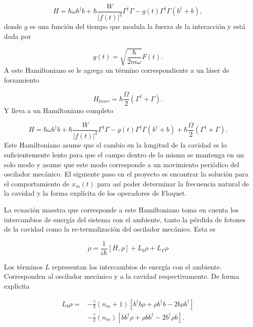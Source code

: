 \documentclass[10pt,a4paper]{report}
\begin{document}
\begin{equation}
H = \hbar \omega b^\dagger b + \hbar\frac{ W}{|f(t)|^2}\Gamma^\dagger \Gamma -g(t)\Gamma^\dagger \Gamma(b^\dagger + b),
\end{equation} donde $g$ es una función del tiempo que modula la fuerza de la interacción y está dada por

\begin{equation}
g(t) = \sqrt{\frac{\hbar}{2m\omega}}F(t).
\end{equation} 
A este Hamiltoniano se le agrega un término correspondiente a un láser de forzamiento

\begin{equation}
H_{laser}= \hbar \frac{\Omega}{2}(\Gamma^\dagger + \Gamma).
\end{equation} Y lleva a un Hamiltoniano completo

\begin{equation}
H = \hbar \omega b^\dagger b + \hbar\frac{ W}{|f(t)|^2}\Gamma^\dagger \Gamma -g(t)\Gamma^\dagger \Gamma(b^\dagger + b) + \hbar \frac{\Omega}{2}(\Gamma^\dagger + \Gamma).
\end{equation} Este Hamiltoniano asume que el cambio en la longitud de la cavidad es lo suficientemente lento para que el campo dentro de la misma se mantenga en un solo modo y asume que este modo corresponde a un movimiento periódico del oscilador mecánico. El siguiente paso en el proyecto es encontrar la solución para el comportamiento de $x_m(t)$ para así poder determinar la frecuencia natural de la cavidad y la forma explícita de los operadores de Floquet.


 La ecuación maestra que corresponde a este Hamiltoniano toma en cuenta los intercambios de energía del sistema con el ambiente, tanto la pérdida de fotones de la cavidad como la re-termalización del oscilador mecánico. Esta es \cite{BarberisLC}

\begin{equation} \label{LCMasterEquation}
\dot{\rho} = \frac{1}{i\hbar}[H,\rho] +L_b\rho + L_\Gamma \rho
\end{equation}

Los términos $L$ representan los intercambios de energía con el ambiente. Corresponden al oscilador mecánico y a la cavidad respectivamente. De forma explícita

\begin{align}
L_b \rho =& - \frac{\gamma}{2}(n_m + 1)[b^\dagger b\rho + \rho b^\dagger b -2b\rho b^\dagger]  \\
 &- \frac{\gamma}{2}(n_m)[ bb^\dagger\rho + \rho  bb^\dagger -2b^\dagger\rho b].\nonumber
\end{align} 
\end{document}
